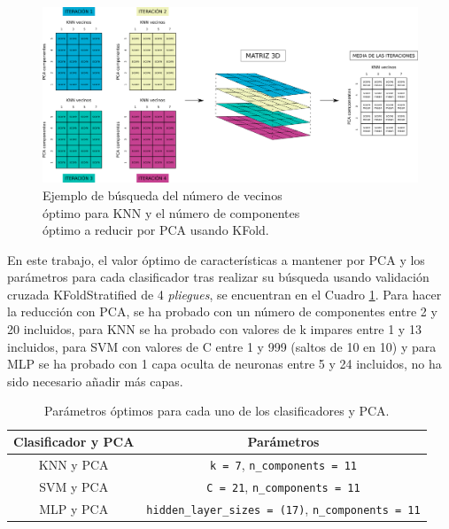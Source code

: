 \begin{figure} [h!]
  \begin{center}
    \includegraphics[width=16cm]{figs/KFold_KNN_PCA.png}
  \end{center}
  \captionsetup{justification=centering}
  \caption{Ejemplo de búsqueda del número de vecinos\\
  óptimo para KNN y el número de componentes\\
  óptimo a reducir por PCA usando KFold.}
  \label{fig:kfold_KNN_PCA}
\end{figure}

En este trabajo, el valor óptimo de características a mantener por PCA y los parámetros para cada clasificador tras realizar su búsqueda usando validación cruzada KFoldStratified de 4 \textit{pliegues}, se encuentran en el Cuadro \ref{cuadro:parametros_optimos}. Para hacer la reducción con PCA, se ha probado con un número de componentes entre 2 y 20 incluidos, para KNN se ha probado con valores de k impares entre 1 y 13 incluidos, para SVM con valores de C entre 1 y 999 (saltos de 10 en 10) y para MLP se ha probado con 1 capa oculta de neuronas entre 5 y 24 incluidos, no ha sido necesario añadir más capas.\\

\begin{table}[H]
\begin{center}
\begin{tabular}{|c|c|}
     \hline
    \textbf{Clasificador y PCA} & \textbf{Parámetros} \\
    \hline
     KNN y PCA & \verb|k = 7|, \verb|n_components = 11|\\
     SVM y PCA & \verb|C = 21|, \verb|n_components = 11|\\
     MLP y PCA & \verb|hidden_layer_sizes = (17)|, \verb|n_components = 11|\\
     \hline
 \end{tabular}
 \captionsetup{justification=centering}
\caption{Parámetros óptimos para cada uno de los clasificadores y PCA.}
\label{cuadro:parametros_optimos}
\end{center}
\end{table}

